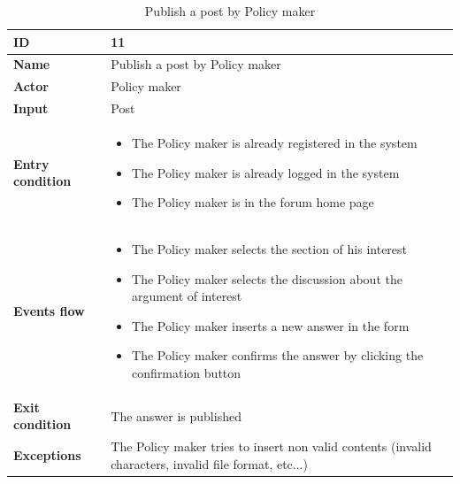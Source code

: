     \begin{longtable}{p{} | p{}}
    \caption{Publish a post by Policy maker}
        \label{tab:publish_post_by_policy_maker}\\
        \hline
        \textbf{ID} & 11\\
        \hline
        \textbf{Name}  &  Publish a post by Policy maker\\
        \hline
        \textbf{Actor}  &  Policy maker\\
        \hline
        \textbf{Input}  &  Post\\
        \hline
        \textbf{Entry condition}  &  
        \begin{itemize}
                \item The Policy maker is already registered in the system
                \item The Policy maker is already logged in the system
                \item The Policy maker is in the forum home page
         \end{itemize}\\
        \hline
        \textbf{Events flow} & 
        \begin{itemize}
                \item The Policy maker selects the section of his interest
                \item The Policy maker selects the discussion about the argument of interest
                \item The Policy maker inserts a new answer in the form
                \item The Policy maker confirms the answer by clicking the confirmation button
                 \end{itemize}
                 \\
        \hline
        \textbf{Exit condition} & The answer is published\\
        \hline
        \textbf{Exceptions} & The Policy maker tries to insert non valid contents (invalid characters, invalid file format, etc...)\\
        \hline
       
    \end{longtable}
    
